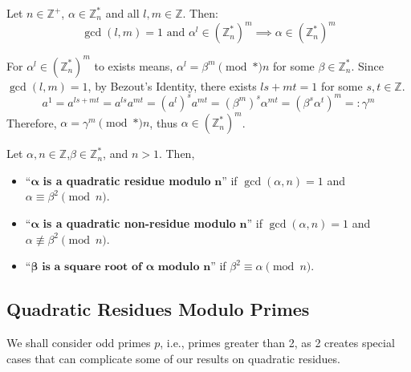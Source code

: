 \newpage 

\begin{theo}
    
    Let $n\in\mathbb{Z^+}$, $\alpha\in\mathbb{Z}_n^*$ and all $l,m\in\mathbb{Z}$. Then:
    \Large\[\gcd(l,m)=1 \text{ and } \alpha^l\in(\mathbb{Z}_n^*)^m \implies \alpha\in(\mathbb{Z}_n^*)^m\]
    \normalsize    
\end{theo}


\begin{Proof}
    For $\alpha^l\in(\mathbb{Z}_n^*)^m$ to exists means, $\alpha^l = \beta^m\pmod*{n}$ for some $\beta\in\mathbb{Z}_n^*$.
    Since $\gcd(l,m)=1$, by Bezout's Identity, there exists $ls+mt=1$ for some $s,t\in\mathbb{Z}$.
    \[
    a^1 = a^{ls+mt} = a^{ls}a^{mt} = \left(a^l \right)^s a^{mt} = \left(\beta^{m}\right)^s\alpha^{mt} = \left(\beta^s\alpha^t\right)^m =: \gamma^m
    \]
\noindent
    Therefore, $\alpha=\gamma^m \pmod*{n}$, thus $\alpha\in(\mathbb{Z}_n^*)^m$.
\end{Proof}

\noindent

\begin{Def}

    Let $\alpha,n\in\mathbb{Z}$,$\beta\in\mathbb{Z}_n^*$, and $n>1$. Then,
    \begin{itemize}
        \item ``$\mathbf{\alpha}$ \textbf{is a quadratic residue modulo }$\textbf{n}$'' if $\gcd(\alpha,n)=1$ and $\alpha\equiv \beta^2\pmod{n}$.
        \item ``$\mathbf{\alpha}$ \textbf{is a quadratic non-residue modulo }$\textbf{n}$'' if $\gcd(\alpha,n)=1$ and $\alpha\not\equiv \beta^2\pmod{n}$.
        \item ``$\mathbf{\beta} \textbf{ is a square root of } \mathbf{\alpha} \textbf{ modulo } \mathbf{n}$'' if $\beta^2\equiv \alpha\pmod{n}$.
    \end{itemize}
\end{Def}

\subsection{Quadratic Residues Modulo Primes}
We shall consider odd primes $p$, i.e., primes greater than 2, as 2 creates special cases that can complicate some of our results on quadratic residues.

